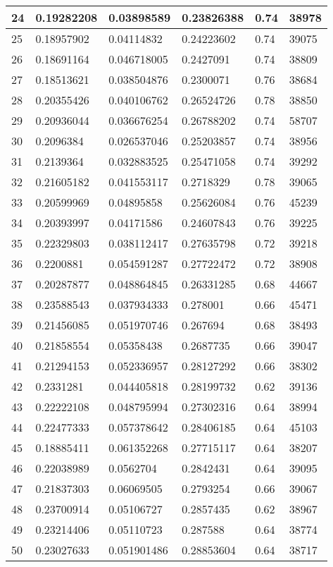 \begin{longtable}{|l|l|l|l|l|l|}
24 & 0.19282208 & 0.03898589 & 0.23826388 & 0.74 & 38978 \\ \hline 
25 & 0.18957902 & 0.04114832 & 0.24223602 & 0.74 & 39075 \\ \hline 
26 & 0.18691164 & 0.046718005 & 0.2427091 & 0.74 & 38809 \\ \hline 
27 & 0.18513621 & 0.038504876 & 0.2300071 & 0.76 & 38684 \\ \hline 
28 & 0.20355426 & 0.040106762 & 0.26524726 & 0.78 & 38850 \\ \hline 
29 & 0.20936044 & 0.036676254 & 0.26788202 & 0.74 & 58707 \\ \hline 
30 & 0.2096384 & 0.026537046 & 0.25203857 & 0.74 & 38956 \\ \hline 
31 & 0.2139364 & 0.032883525 & 0.25471058 & 0.74 & 39292 \\ \hline 
32 & 0.21605182 & 0.041553117 & 0.2718329 & 0.78 & 39065 \\ \hline 
33 & 0.20599969 & 0.04895858 & 0.25626084 & 0.76 & 45239 \\ \hline 
34 & 0.20393997 & 0.04171586 & 0.24607843 & 0.76 & 39225 \\ \hline 
35 & 0.22329803 & 0.038112417 & 0.27635798 & 0.72 & 39218 \\ \hline 
36 & 0.2200881 & 0.054591287 & 0.27722472 & 0.72 & 38908 \\ \hline 
37 & 0.20287877 & 0.048864845 & 0.26331285 & 0.68 & 44667 \\ \hline 
38 & 0.23588543 & 0.037934333 & 0.278001 & 0.66 & 45471 \\ \hline 
39 & 0.21456085 & 0.051970746 & 0.267694 & 0.68 & 38493 \\ \hline 
40 & 0.21858554 & 0.05358438 & 0.2687735 & 0.66 & 39047 \\ \hline 
41 & 0.21294153 & 0.052336957 & 0.28127292 & 0.66 & 38302 \\ \hline 
42 & 0.2331281 & 0.044405818 & 0.28199732 & 0.62 & 39136 \\ \hline 
43 & 0.22222108 & 0.048795994 & 0.27302316 & 0.64 & 38994 \\ \hline 
44 & 0.22477333 & 0.057378642 & 0.28406185 & 0.64 & 45103 \\ \hline 
45 & 0.18885411 & 0.061352268 & 0.27715117 & 0.64 & 38207 \\ \hline 
46 & 0.22038989 & 0.0562704 & 0.2842431 & 0.64 & 39095 \\ \hline 
47 & 0.21837303 & 0.06069505 & 0.2793254 & 0.66 & 39067 \\ \hline 
48 & 0.23700914 & 0.05106727 & 0.2857435 & 0.62 & 38967 \\ \hline 
49 & 0.23214406 & 0.05110723 & 0.287588 & 0.64 & 38774 \\ \hline 
50 & 0.23027633 & 0.051901486 & 0.28853604 & 0.64 & 38717 \\ \hline 
\end{longtable}